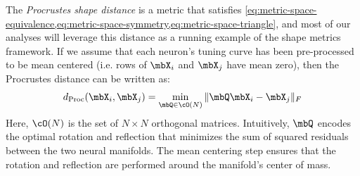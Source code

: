The \textit{Procrustes shape distance} \parencite{schonemann1966generalized} is a metric that satisfies \cref{eq:metric-space-equivalence,eq:metric-space-symmetry,eq:metric-space-triangle}, and most of our analyses will leverage this distance as a running example of the shape metrics framework.
If we assume that each neuron's tuning curve has been pre-processed to be mean centered (i.e. rows of $\mbX_i$ and $\mbX_j$ have mean zero), then the Procrustes distance can be written as:
\begin{equation}
\label{eq:procrustes-distance}
d_{\text{Proc}}(\mbX_i, \mbX_j) = \min_{\mbQ \in \cO(N)} \Vert \mbQ \mbX_i - \mbX_j \Vert_F
\end{equation}
Here, $\cO(N)$ is the set of $N \times N$ orthogonal matrices.
Intuitively, $\mbQ$ encodes the optimal rotation and reflection that minimizes the sum of squared residuals between the two neural manifolds.
The mean centering step ensures that the rotation and reflection are performed around the manifold's center of mass.


